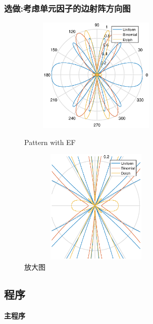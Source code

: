 \subsubsection{选做:考虑单元因子的边射阵方向图}
\begin{figure}[!ht]
	\begin{minipage}[t]{0.35\linewidth}
		\centering
		\includegraphics[height=5.5cm,width=7.5cm]{TenEle_with_EF.eps}
		\caption{Pattern with EF}
	\end{minipage}%
	\hfill
	\begin{minipage}[t]{0.5\linewidth}
		\centering
		\includegraphics[height=5.5cm,width=7.5cm]{TenEle_with_EF_fangda.eps}
		\caption{放大图}
		
	\end{minipage}\label{fig:10eleEF}
\end{figure}

\subsection{程序}
\noindent \textbf{主程序}
\begin{lstlisting}[language={matlab},keywordstyle=\color{blue!70},commentstyle=\color{red!50!green!50!blue!50},frame=shadowbox, rulesepcolor=\color{red!20!green!20!blue!20}] 


\end{lstlisting}